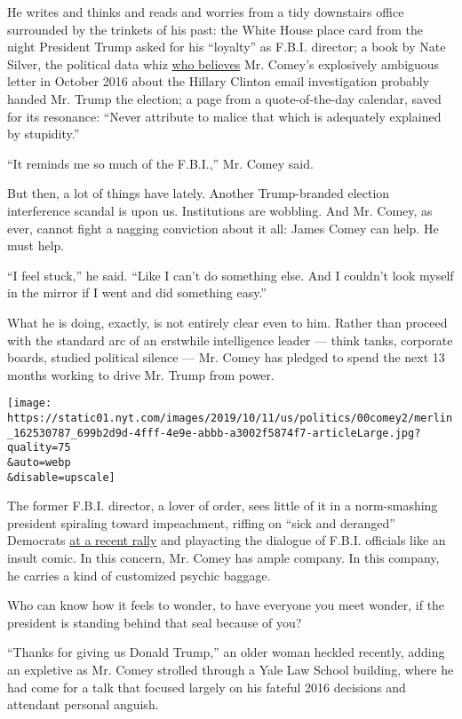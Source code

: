 He writes and thinks and reads and worries from a tidy downstairs office
surrounded by the trinkets of his past: the White House place card from
the night President Trump asked for his ``loyalty'' as F.B.I. director;
a book by Nate Silver, the political data whiz
\href{https://fivethirtyeight.com/features/the-comey-letter-probably-cost-clinton-the-election/}{who
believes} Mr. Comey's explosively ambiguous letter in October 2016 about
the Hillary Clinton email investigation probably handed Mr. Trump the
election; a page from a quote-of-the-day calendar, saved for its
resonance: ``Never attribute to malice that which is adequately
explained by stupidity.''

``It reminds me so much of the F.B.I.,'' Mr. Comey said.

But then, a lot of things have lately. Another Trump-branded election
interference scandal is upon us. Institutions are wobbling. And Mr.
Comey, as ever, cannot fight a nagging conviction about it all: James
Comey can help. He must help.

``I feel stuck,'' he said. ``Like I can't do something else. And I
couldn't look myself in the mirror if I went and did something easy.''

What he is doing, exactly, is not entirely clear even to him. Rather
than proceed with the standard arc of an erstwhile intelligence leader
--- think tanks, corporate boards, studied political silence --- Mr.
Comey has pledged to spend the next 13 months working to drive Mr. Trump
from power.

\texttt{[image: https://static01.nyt.com/images/2019/10/11/us/politics/00comey2/merlin\_162530787\_699b2d9d-4fff-4e9e-abbb-a3002f5874f7-articleLarge.jpg?quality=75\\\&auto=webp\\\&disable=upscale]}

The former F.B.I. director, a lover of order, sees little of it in a
norm-smashing president spiraling toward impeachment, riffing on ``sick
and deranged'' Democrats
\href{https://www.nytimes.com/2019/10/10/us/politics/trump-rally-minneapolis.html}{at
a recent rally} and playacting the dialogue of F.B.I. officials like an
insult comic. In this concern, Mr. Comey has ample company. In this
company, he carries a kind of customized psychic baggage.

Who can know how it feels to wonder, to have everyone you meet wonder,
if the president is standing behind that seal because of you?

``Thanks for giving us Donald Trump,'' an older woman heckled recently,
adding an expletive as Mr. Comey strolled through a Yale Law School
building, where he had come for a talk that focused largely on his
fateful 2016 decisions and attendant personal anguish.

